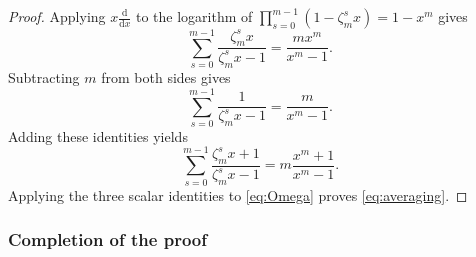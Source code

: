 \documentclass[12pt]{amsart}
\theoremstyle{definition}
\numberwithin{equation}{section}
\theoremstyle{definition}
\begin{document}
\begin{proof}
Applying $x\frac{\mathrm d}{\mathrm d x}$ to the logarithm of
$\prod_{s=0}^{m-1}(1-\zeta_m^s x)=1-x^m$
gives
\[
 \sum_{s=0}^{m-1}\frac{\zeta_m^s x}{\zeta_m^s x-1}
 =\frac{m x^m}{x^m-1}.
\]
Subtracting $m$ from both sides gives
\[
 \sum_{s=0}^{m-1}\frac1{\zeta_m^s x-1}
 =\frac{m}{x^m-1}.
\]
Adding these identities yields
\[
 \sum_{s=0}^{m-1}\frac{\zeta_m^s x+1}{\zeta_m^s x-1}
 =m\frac{x^m+1}{x^m-1}.
\]
Applying the three scalar identities to \eqref{eq:Omega}
proves \eqref{eq:averaging}.
\end{proof}

\subsubsection{Completion of the proof}
\end{document}
